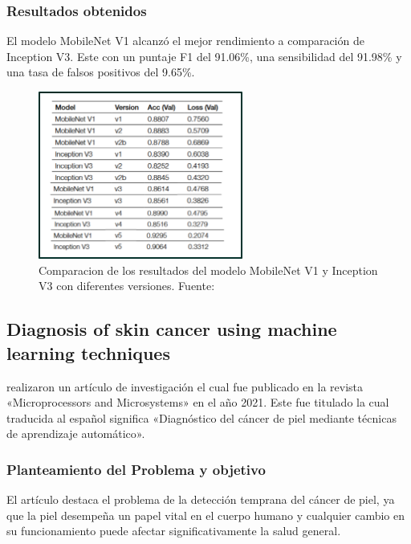 \subsubsection{Resultados obtenidos}
El modelo MobileNet V1 alcanzó el mejor rendimiento a comparación de Inception V3. Este con un puntaje F1 del 91.06\%, una sensibilidad del 91.98\% y una tasa de falsos positivos del 9.65\%. 


\begin{figure}[h]
	\begin{center}
		\includegraphics[width=0.6\textwidth]{2/figuras/Design_tool_the_classification_imagen_01.png}
		\caption{Comparacion de los resultados del modelo MobileNet V1 y Inception V3 con diferentes versiones. Fuente: \cite{vargas_2021diseno}}
		\label{1:fig 7}
	\end{center}
\end{figure}





\subsection{Diagnosis of skin cancer using machine learning techniques \citep*{murugan_2021diagnosis}}

\citeauthor{murugan_2021diagnosis} realizaron un artículo de investigación el cual fue publicado en la revista «Microprocessors and Microsystems» en el año 2021. Este fue titulado  la cual traducida al español significa «Diagnóstico del cáncer de piel mediante técnicas de aprendizaje automático».



\subsubsection{Planteamiento del Problema y objetivo}
 El artículo destaca el problema de la detección temprana del cáncer de piel, ya que la piel desempeña un papel vital en el cuerpo humano y cualquier cambio en su funcionamiento puede afectar significativamente la salud general.

